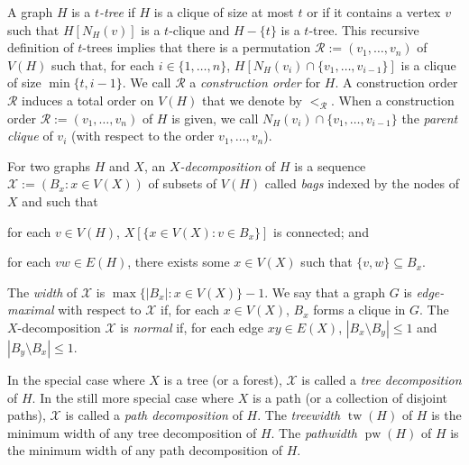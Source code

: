 \documentclass[kpfonts]{patmorin}
\DeclareMathOperator{\tw}{tw}
\DeclareMathOperator{\pw}{pw}
\theoremstyle{named}
\begin{document}
A graph $H$ is a \emph{$t$-tree} if $H$ is a clique of size at most $t$ or if it contains a vertex $v$ such that $H[N_H(v)]$ is a $t$-clique and $H-\{t\}$ is a $t$-tree.
This recursive definition of $t$-trees implies that there is a permutation $\mathcal{R}:=(v_1,\ldots,v_n)$ of $V(H)$ such that, for each $i\in\{1,\ldots,n\}$, $H[N_H(v_i)\cap \{v_1,\ldots,v_{i-1}\}]$ is a clique of size $\min\{t,i-1\}$.  We call $\mathcal{R}$ a \emph{construction order} for $H$.  A construction order $\mathcal{R}$ induces a total order on $V(H)$ that we denote by $<_{\mathcal{R}}$.  When a construction order $\mathcal{R}:=(v_1,\ldots,v_n)$ of $H$ is given, we call $N_H(v_i)\cap \{v_1,\ldots,v_{i-1}\}$ the \emph{parent clique} of $v_i$ (with respect to the order $v_1,\ldots,v_n$).

For two graphs $H$ and $X$, an \emph{$X$-decomposition} of $H$ is a sequence $\mathcal{X}:=(B_x:x\in V(X))$ of subsets of $V(H)$ called \emph{bags} indexed by the nodes of $X$ and such that
 \begin{inparaenum}[(i)]
     \item for each $v\in V(H)$, $X[\{x\in V(X):v\in B_x\}]$ is connected; and
     \item for each $vw\in E(H)$, there exists some $x\in V(X)$ such that $\{v,w\}\subseteq B_x$.
\end{inparaenum}
The \emph{width} of $\mathcal{X}$ is $\max\{|B_x|:x\in V(X)\}-1$. We say that a graph $G$ is \emph{edge-maximal} with respect to $\mathcal{X}$ if, for each $x\in V(X)$, $B_x$ forms a clique in $G$. The $X$-decomposition $\mathcal{X}$ is \emph{normal} if, for each edge $xy\in E(X)$, $|B_x\setminus B_y|\le 1$ and $|B_y\setminus B_x|\le 1$.

In the special case where $X$ is a tree (or a forest), $\mathcal{X}$ is called a \emph{tree decomposition} of $H$.  In the still more special case where $X$ is a path (or a collection of disjoint paths), $\mathcal{X}$ is called a \emph{path decomposition} of $H$. The \emph{treewidth} $\tw(H)$ of $H$ is the minimum width of any tree decomposition of $H$. The \emph{pathwidth} $\pw(H)$ of $H$ is the minimum width of any path decomposition of $H$.
\end{document}
